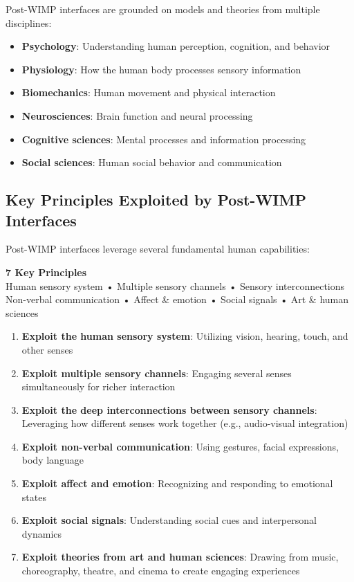 \documentclass[11pt,a4paper]{article}
\theoremstyle{definition}
\theoremstyle{plain}
\theoremstyle{remark}
\begin{document}
Post-WIMP interfaces are grounded on models and theories from multiple disciplines:

\begin{itemize}
    \item \textbf{Psychology}: Understanding human perception, cognition, and behavior
    \item \textbf{Physiology}: How the human body processes sensory information
    \item \textbf{Biomechanics}: Human movement and physical interaction
    \item \textbf{Neurosciences}: Brain function and neural processing
    \item \textbf{Cognitive sciences}: Mental processes and information processing
    \item \textbf{Social sciences}: Human social behavior and communication
\end{itemize}

\subsection{Key Principles Exploited by Post-WIMP Interfaces}

Post-WIMP interfaces leverage several fundamental human capabilities:

\begin{center}
\colorbox{yellow!20}{\parbox{0.9\textwidth}{
\centering
\textbf{7 Key Principles}\\[0.2cm]
Human sensory system • Multiple sensory channels • Sensory interconnections\\
Non-verbal communication • Affect \& emotion • Social signals • Art \& human sciences
}}
\end{center}

\begin{enumerate}
    \item \textbf{Exploit the human sensory system}: Utilizing vision, hearing, touch, and other senses
    
    \item \textbf{Exploit multiple sensory channels}: Engaging several senses simultaneously for richer interaction
    
    \item \textbf{Exploit the deep interconnections between sensory channels}: Leveraging how different senses work together (e.g., audio-visual integration)
    
    \item \textbf{Exploit non-verbal communication}: Using gestures, facial expressions, body language
    
    \item \textbf{Exploit affect and emotion}: Recognizing and responding to emotional states
    
    \item \textbf{Exploit social signals}: Understanding social cues and interpersonal dynamics
    
    \item \textbf{Exploit theories from art and human sciences}: Drawing from music, choreography, theatre, and cinema to create engaging experiences
\end{enumerate}
\end{document}
